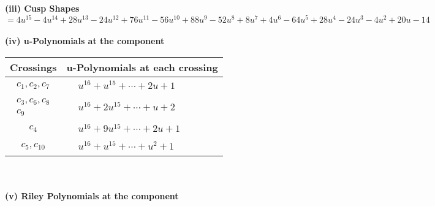 \documentclass[1p]{elsarticle_modified}
\theoremstyle{definition}
\begin{document}
\flushleft \textbf{(iii) Cusp Shapes $= 4 u^{15}-4 u^{14}+28 u^{13}-24 u^{12}+76 u^{11}-56 u^{10}+88 u^9-52 u^8+8 u^7+4 u^6-64 u^5+28 u^4-24 u^3-4 u^2+20 u-14$}\\~\\
\newpage\renewcommand{\arraystretch}{1}
\flushleft \textbf{(iv) u-Polynomials at the component}\newline \\
\begin{tabular}{m{50pt}|m{274pt}}
Crossings & \hspace{64pt}u-Polynomials at each crossing \\
\hline $$\begin{aligned}c_{1},c_{2},c_{7}\end{aligned}$$&$\begin{aligned}
&u^{16}+u^{15}+\cdots+2 u+1
\end{aligned}$\\
\hline $$\begin{aligned}c_{3},c_{6},c_{8}\\c_{9}\end{aligned}$$&$\begin{aligned}
&u^{16}+2 u^{15}+\cdots+u+2
\end{aligned}$\\
\hline $$\begin{aligned}c_{4}\end{aligned}$$&$\begin{aligned}
&u^{16}+9 u^{15}+\cdots+2 u+1
\end{aligned}$\\
\hline $$\begin{aligned}c_{5},c_{10}\end{aligned}$$&$\begin{aligned}
&u^{16}+u^{15}+\cdots+u^2+1
\end{aligned}$\\
\hline
\end{tabular}\\~\\
\newpage\renewcommand{\arraystretch}{1}
\flushleft \textbf{(v) Riley Polynomials at the component}\newline \\
\end{document}
